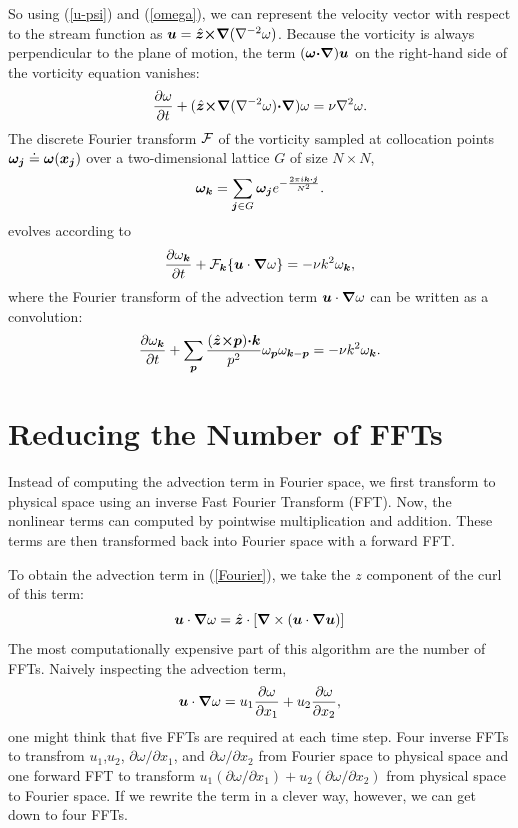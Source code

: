 \documentclass[12pt]{article}
\def\v{\bm}
\def\lap{{\nabla}^2}
\def\lapinv{{\nabla}^{-2}}
\def\vw{{\v\w}}
\def\Eq#1{(\ref{#1})}
\begin{document}
So using \Eq{u-psi} and \Eq{omega}, we can represent the velocity
vector with respect to the stream function as
$\vu=\hat{\vz}\cross\grad(\lapinv\omega)$.
Because the vorticity is always perpendicular to the plane of motion,
the term $(\vw\dot\grad)\vu$ on the right-hand side of the vorticity equation vanishes:
$$\frac{\partial \omega}{\partial t} + (\hat{\vz}\cross\grad(\lapinv\omega)\dot\grad)\omega= \nu\lap\omega .$$
The discrete Fourier transform ${\cal F}$ of the vorticity sampled at collocation
points $\vw_\vj\doteq\vw(\vx_\vj)$ over a two-dimensional lattice
$G$ of size $N\times N$,
$$
\vw_{\vk}=\sum_{\vj\in G} \vw_\vj e^{-\fr{2\pi i\vk\dot\vj}{N^2}}.
$$
evolves according to
\begin{equation}\label{Fourier}
\frac{\partial\omega_{\vk}}{\partial t} + {\cal F}_\vk\{\vu\cdot\grad\omega\}= -\nu k^2\omega_{\vk},
\end{equation}
where the Fourier transform of the advection term
$\vu\cdot\grad\omega$ can be written as a convolution:
\begin{equation}\label{Fourier-expand}
\frac{\partial\omega_{\vk}}{\partial t} + \sum_{\vp}{\frac{(\hat{\vz}\cross\vp)\dot\vk}{p^2}\omega_{\vp}\omega_{\vk-\vp}}= -\nu k^2\omega_{\vk}.
\end{equation}
\section{Reducing the Number of FFTs}
Instead of computing the advection term in Fourier space, we first transform to physical space using an inverse Fast Fourier Transform (FFT). Now, the nonlinear terms can computed by pointwise multiplication and addition. These terms are then transformed back into Fourier space with a forward FFT.

To obtain the advection term in \Eq{Fourier}, we take the $z$ component of the curl of this term:
\begin{equation}\label{zAdvection}
\vu\cdot\grad\omega =\hat{\vz}\cdot \left[\grad \times \left(\vu\cdot\grad\vu \right)\right]
\end{equation}
The most computationally expensive part of this algorithm are the number of FFTs. Naively inspecting the advection term,
\begin{equation}
\vu\cdot\grad\omega = u_1\frac{\partial \omega}{\partial x_1}+u_2\frac{\partial \omega}{\partial x_2},
\end{equation}
one might think that five FFTs are required at each time step. Four inverse FFTs to transfrom $u_1$,$ u_2$, $\partial \omega/\partial x_1$, and $\partial \omega/\partial x_2$ from Fourier space to physical space and one forward FFT to transform $u_1\left(\partial \omega/\partial x_1\right)+u_2\left(\partial \omega/\partial x_2\right)$ from physical space to Fourier space. If we rewrite the term in a clever way, however, we can get down to four FFTs.
\end{document}
